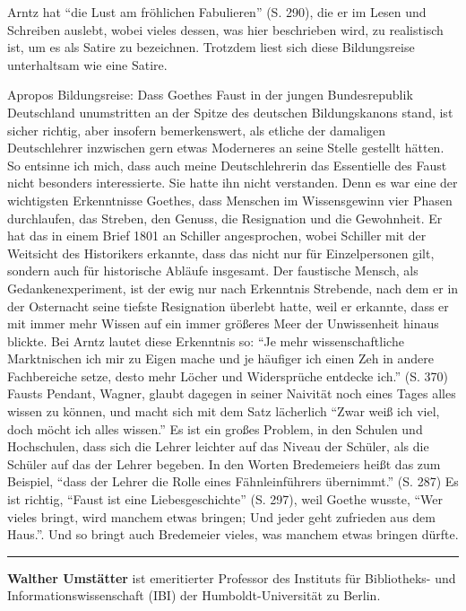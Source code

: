 \documentclass[a4paper,
fontsize=11pt,
oneside,
numbers=noperiodatend,
parskip=half-,
bibliography=totoc,
final
]{scrartcl}
\begin{document}
Arntz hat \enquote{die Lust am fröhlichen Fabulieren} (S. 290), die er
im Lesen und Schreiben auslebt, wobei vieles dessen, was hier
beschrieben wird, zu realistisch ist, um es als Satire zu bezeichnen.
Trotzdem liest sich diese Bildungsreise unterhaltsam wie eine Satire.

Apropos Bildungsreise: Dass Goethes Faust in der jungen Bundesrepublik
Deutschland unumstritten an der Spitze des deutschen Bildungskanons
stand, ist sicher richtig, aber insofern bemerkenswert, als etliche der
damaligen Deutschlehrer inzwischen gern etwas Moderneres an seine Stelle
gestellt hätten. So entsinne ich mich, dass auch meine Deutschlehrerin
das Essentielle des Faust nicht besonders interessierte. Sie hatte ihn
nicht verstanden. Denn es war eine der wichtigsten Erkenntnisse Goethes,
dass Menschen im Wissensgewinn vier Phasen durchlaufen, das Streben, den
Genuss, die Resignation und die Gewohnheit. Er hat das in einem Brief
1801 an Schiller angesprochen, wobei Schiller mit der Weitsicht des
Historikers erkannte, dass das nicht nur für Einzelpersonen gilt,
sondern auch für historische Abläufe insgesamt. Der faustische Mensch,
als Gedankenexperiment, ist der ewig nur nach Erkenntnis Strebende, nach
dem er in der Osternacht seine tiefste Resignation überlebt hatte, weil
er erkannte, dass er mit immer mehr Wissen auf ein immer größeres Meer
der Unwissenheit hinaus blickte. Bei Arntz lautet diese Erkenntnis so:
\enquote{Je mehr wissenschaftliche Marktnischen ich mir zu Eigen mache
und je häufiger ich einen Zeh in andere Fachbereiche setze, desto mehr
Löcher und Widersprüche entdecke ich.} (S. 370) Fausts Pendant, Wagner,
glaubt dagegen in seiner Naivität noch eines Tages alles wissen zu
können, und macht sich mit dem Satz lächerlich \enquote{Zwar weiß ich
viel, doch möcht ich alles wissen.} Es ist ein großes Problem, in den
Schulen und Hochschulen, dass sich die Lehrer leichter auf das Niveau
der Schüler, als die Schüler auf das der Lehrer begeben. In den Worten
Bredemeiers heißt das zum Beispiel, \enquote{dass der Lehrer die Rolle
eines Fähnleinführers übernimmt.} (S. 287) Es ist richtig,
\enquote{Faust ist eine Liebesgeschichte} (S. 297), weil Goethe wusste,
\enquote{Wer vieles bringt, wird manchem etwas bringen; Und jeder geht
zufrieden aus dem Haus.}. Und so bringt auch Bredemeier vieles, was
manchem etwas bringen dürfte.

\begin{center}\rule{3in}{0.4pt}\end{center}

\textbf{Walther Umstätter} ist emeritierter Professor des Instituts für
Bibliotheks- und Informationswissenschaft (IBI) der Humboldt-Universität
zu Berlin.~

\end{document}

